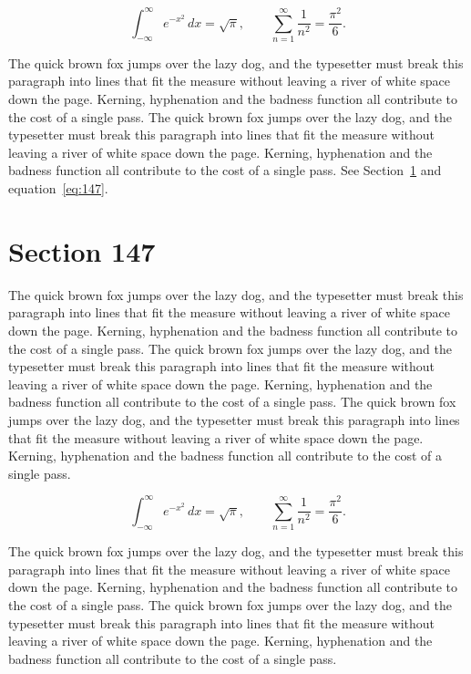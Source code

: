 \documentclass{article}
\begin{document}
\begin{equation}\label{eq:146}
\int_{-\infty}^{\infty} e^{-x^{2}}\,dx = \sqrt{\pi}, \qquad
\sum_{n=1}^{\infty} \frac{1}{n^{2}} = \frac{\pi^{2}}{6}.
\end{equation}

The quick brown fox jumps over the lazy dog, and the typesetter must break this paragraph into lines that fit the measure without leaving a river of white space down the page. Kerning, hyphenation and the badness function all contribute to the cost of a single pass. The quick brown fox jumps over the lazy dog, and the typesetter must break this paragraph into lines that fit the measure without leaving a river of white space down the page. Kerning, hyphenation and the badness function all contribute to the cost of a single pass. 
See Section~\ref{sec:147} and equation~\eqref{eq:147}.
\section{Section 147}
\label{sec:147}
The quick brown fox jumps over the lazy dog, and the typesetter must break this paragraph into lines that fit the measure without leaving a river of white space down the page. Kerning, hyphenation and the badness function all contribute to the cost of a single pass. The quick brown fox jumps over the lazy dog, and the typesetter must break this paragraph into lines that fit the measure without leaving a river of white space down the page. Kerning, hyphenation and the badness function all contribute to the cost of a single pass. The quick brown fox jumps over the lazy dog, and the typesetter must break this paragraph into lines that fit the measure without leaving a river of white space down the page. Kerning, hyphenation and the badness function all contribute to the cost of a single pass. 

\begin{equation}\label{eq:147}
\int_{-\infty}^{\infty} e^{-x^{2}}\,dx = \sqrt{\pi}, \qquad
\sum_{n=1}^{\infty} \frac{1}{n^{2}} = \frac{\pi^{2}}{6}.
\end{equation}

The quick brown fox jumps over the lazy dog, and the typesetter must break this paragraph into lines that fit the measure without leaving a river of white space down the page. Kerning, hyphenation and the badness function all contribute to the cost of a single pass. The quick brown fox jumps over the lazy dog, and the typesetter must break this paragraph into lines that fit the measure without leaving a river of white space down the page. Kerning, hyphenation and the badness function all contribute to the cost of a single pass. 
\end{document}
